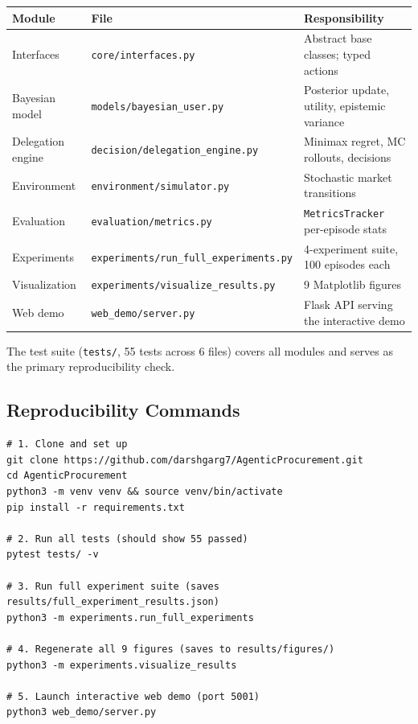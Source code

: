 \documentclass[11pt,letterpaper]{article}
\begin{document}
\begin{center}
\footnotesize
\begin{tabular}{@{}lll@{}}
\toprule
Module & File & Responsibility \\
\midrule
Interfaces & \texttt{core/interfaces.py} & Abstract base classes; typed actions \\
Bayesian model & \texttt{models/bayesian\_user.py} & Posterior update, utility, epistemic variance \\
Delegation engine & \texttt{decision/delegation\_engine.py} & Minimax regret, MC rollouts, decisions \\
Environment & \texttt{environment/simulator.py} & Stochastic market transitions \\
Evaluation & \texttt{evaluation/metrics.py} & \texttt{MetricsTracker} per-episode stats \\
Experiments & \texttt{experiments/run\_full\_experiments.py} & 4-experiment suite, 100 episodes each \\
Visualization & \texttt{experiments/visualize\_results.py} & 9 Matplotlib figures \\
Web demo & \texttt{web\_demo/server.py} & Flask API serving the interactive demo \\
\bottomrule
\end{tabular}
\end{center}

The test suite (\texttt{tests/}, 55 tests across 6 files) covers all modules and serves as the primary reproducibility check.

\subsection{Reproducibility Commands}

\begin{verbatim}
# 1. Clone and set up
git clone https://github.com/darshgarg7/AgenticProcurement.git
cd AgenticProcurement
python3 -m venv venv && source venv/bin/activate
pip install -r requirements.txt

# 2. Run all tests (should show 55 passed)
pytest tests/ -v

# 3. Run full experiment suite (saves results/full_experiment_results.json)
python3 -m experiments.run_full_experiments

# 4. Regenerate all 9 figures (saves to results/figures/)
python3 -m experiments.visualize_results

# 5. Launch interactive web demo (port 5001)
python3 web_demo/server.py
\end{verbatim}
\end{document}
